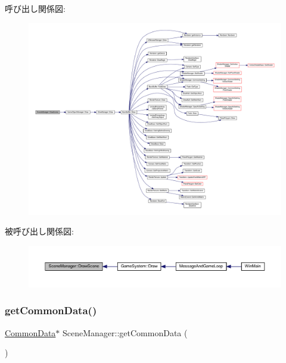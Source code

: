 呼び出し関係図\+:
\nopagebreak
\begin{figure}[H]
\begin{center}
\leavevmode
\includegraphics[width=350pt]{class_scene_manager_a828b35826f757b8af34aa767c6b40378_cgraph}
\end{center}
\end{figure}
被呼び出し関係図\+:
\nopagebreak
\begin{figure}[H]
\begin{center}
\leavevmode
\includegraphics[width=350pt]{class_scene_manager_a828b35826f757b8af34aa767c6b40378_icgraph}
\end{center}
\end{figure}
\mbox{\label{class_scene_manager_a73b2a1c2be8f5b9027af7d88d2ec6457}} 
\subsubsection{\texorpdfstring{get\+Common\+Data()}{getCommonData()}}
{\footnotesize\ttfamily \mbox{\hyperlink{class_scene_manager_1_1_common_data}{Common\+Data}}$\ast$ Scene\+Manager\+::get\+Common\+Data (\begin{DoxyParamCaption}{ }\end{DoxyParamCaption})\hspace{0.3cm}{\ttfamily [inline]}}



